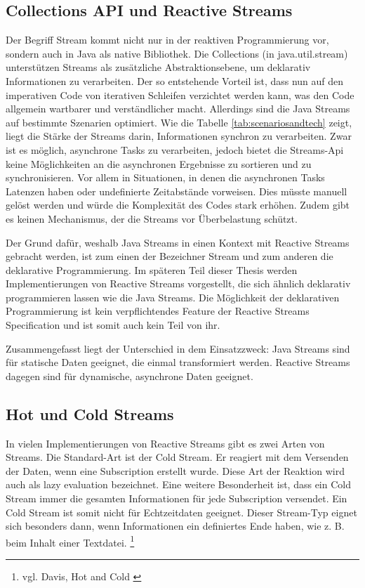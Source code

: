 \subsection{Collections API und Reactive Streams}
Der Begriff Stream kommt nicht nur in der reaktiven Programmierung vor, sondern auch in Java als native Bibliothek. Die Collections (in java.util.stream) unterstützen Streams als zusätzliche Abstraktionsebene, um deklarativ Informationen zu verarbeiten. Der so entstehende Vorteil ist, dass nun auf den imperativen Code von iterativen Schleifen verzichtet werden kann, was den Code allgemein wartbarer und verständlicher macht. Allerdings sind die Java Streams auf bestimmte Szenarien optimiert. Wie die Tabelle \ref{tab:scenariosandtech} zeigt, liegt die Stärke der Streams darin, Informationen synchron zu verarbeiten. Zwar ist es möglich, asynchrone Tasks zu verarbeiten, jedoch bietet die Streams-Api keine Möglichkeiten an die asynchronen Ergebnisse zu sortieren und zu synchronisieren. Vor allem in Situationen, in denen die asynchronen Tasks Latenzen haben oder undefinierte Zeitabstände vorweisen. Dies müsste manuell gelöst werden und würde die Komplexität des Codes stark erhöhen. Zudem gibt es keinen Mechanismus, der die Streams vor Überbelastung schützt.

Der Grund dafür, weshalb Java Streams in einen Kontext mit Reactive Streams gebracht werden, ist zum einen der Bezeichner Stream und zum anderen die deklarative Programmierung. Im späteren Teil dieser Thesis werden Implementierungen von Reactive Streams vorgestellt, die sich ähnlich deklarativ programmieren lassen wie die Java Streams. Die Möglichkeit der deklarativen Programmierung ist kein verpflichtendes Feature der Reactive Streams Specification und ist somit auch kein Teil von ihr.

Zusammengefasst liegt der Unterschied in dem Einsatzzweck: Java Streams sind für statische Daten geeignet, die einmal transformiert werden. Reactive Streams dagegen sind für dynamische, asynchrone Daten geeignet.

\subsection{Hot und Cold Streams}
\label{subsec:hotncold}
In vielen Implementierungen von Reactive Streams gibt es zwei Arten von Streams. Die Standard-Art ist der Cold Stream. Er reagiert mit dem Versenden der Daten, wenn eine Subscription erstellt wurde. Diese Art der Reaktion wird auch als lazy evaluation bezeichnet. Eine weitere Besonderheit ist, dass ein Cold Stream immer die gesamten Informationen für jede Subscription versendet. Ein Cold Stream ist somit nicht für Echtzeitdaten geeignet. Dieser Stream-Typ eignet sich besonders dann, wenn Informationen ein definiertes Ende haben, wie z. B. beim Inhalt einer Textdatei. \footnote{vgl. Davis, Hot and Cold \cite{buch:reactive_streams_in_java:kapitel3} \label{hot_and_cold}}

